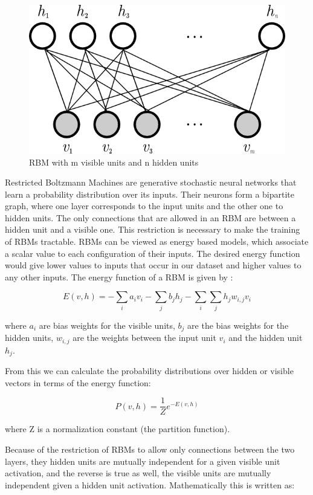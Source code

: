 \begin{figure}[h]
\begin{center}
\includegraphics[width=0.7\columnwidth]{img/rbm_graph.png}
\caption{
\label{fig:rbm_graph}
RBM with m visible units and n hidden units \cite{rbm_graph}
}
\end{center}
\end{figure}

Restricted Boltzmann Machines are generative stochastic neural networks that learn a probability distribution over its inputs. Their neurons form a bipartite graph, where one layer corresponds to the input units and the other one to hidden units. The only connections that are allowed in an RBM are between a hidden unit and a visible one. This restriction is necessary to make the training of RBMs tractable. RBMs can be viewed as energy based models, which associate a scalar value to each configuration of their inputs. The desired energy function would give lower values to inputs that occur in our dataset and higher values to any other inputs. The energy function of a RBM is given by \cite{hinton2010practical}:

\[ 
	E(v,h) = -\sum_i a_i v_i - \sum_j b_j h_j -\sum_i \sum_j h_j w_{i,j} v_i	
\]

where $ a_i $ are bias weights for the visible units, $ b_j $ are the bias weights for the hidden units, $ w_{i,j} $ are the weights between the input unit $v_i$ and the hidden unit $h_j $. 

From this we can calculate the probability distributions over hidden or visible vectors in terms of the energy function:

\[
	P(v,h) = \frac{1}{Z} e^{-E(v,h)}
\]

where Z is a normalization constant (the partition function). 

Because of the restriction of RBMs to allow only connections between the two layers, they hidden units are mutually independent for a given visible unit activation, and the reverse is true as well, the visible units are mutually independent given a hidden unit activation. Mathematically this is written as:

